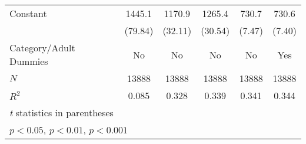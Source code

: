 \begin{table}[htbp]
\begin{tabular}{l*{5}{c}}
Constant    &      1445.1\sym{***}&      1170.9\sym{***}&      1265.4\sym{***}&       730.7\sym{***}&       730.6\sym{***}\\
            &     (79.84)         &     (32.11)         &     (30.54)         &      (7.47)         &      (7.40)         \\
Category/Adult Dummies &          No         &          No         &          No         &          No         &         Yes         \\
\hline
\(N\)       &       13888         &       13888         &       13888         &       13888         &       13888         \\
\(R^{2}\)   &       0.085         &       0.328         &       0.339         &       0.341         &       0.344         \\
\hline\hline
\multicolumn{6}{l}{\footnotesize \textit{t} statistics in parentheses}\\
\multicolumn{6}{l}{\footnotesize \sym{*} \(p<0.05\), \sym{**} \(p<0.01\), \sym{***} \(p<0.001\)}\\
\end{tabular}
\end{table}
